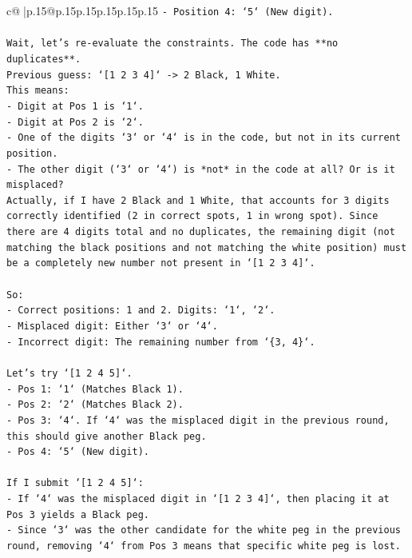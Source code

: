 \documentclass{article}
\begin{document}
{\begin{supertabular}{c@{$\;$}|p{.15\linewidth}@{}p{.15\linewidth}p{.15\linewidth}p{.15\linewidth}p{.15\linewidth}p{.15\linewidth}}
{{{\texttt{{-} Position 4: `5` (New digit).} \\
\\ 
\texttt{Wait, let's re{-}evaluate the constraints. The code has **no duplicates**.} \\
\texttt{Previous guess: `{[}1 2 3 4{]}` {-}> 2 Black, 1 White.} \\
\texttt{This means:} \\
\texttt{{-} Digit at Pos 1 is `1`.} \\
\texttt{{-} Digit at Pos 2 is `2`.} \\
\texttt{{-} One of the digits `3` or `4` is in the code, but not in its current position.} \\
\texttt{{-} The other digit (`3` or `4`) is *not* in the code at all? Or is it misplaced?} \\
\texttt{Actually, if I have 2 Black and 1 White, that accounts for 3 digits correctly identified (2 in correct spots, 1 in wrong spot). Since there are 4 digits total and no duplicates, the remaining digit (not matching the black positions and not matching the white position) must be a completely new number not present in `{[}1 2 3 4{]}`.} \\
\\ 
\texttt{So:} \\
\texttt{{-} Correct positions: 1 and 2. Digits: `1`, `2`.} \\
\texttt{{-} Misplaced digit: Either `3` or `4`.} \\
\texttt{{-} Incorrect digit: The remaining number from `\{3, 4\}`.} \\
\\ 
\texttt{Let's try `{[}1 2 4 5{]}`.} \\
\texttt{{-} Pos 1: `1` (Matches Black 1).} \\
\texttt{{-} Pos 2: `2` (Matches Black 2).} \\
\texttt{{-} Pos 3: `4`. If `4` was the misplaced digit in the previous round, this should give another Black peg.} \\
\texttt{{-} Pos 4: `5` (New digit).} \\
\\ 
\texttt{If I submit `{[}1 2 4 5{]}`:} \\
\texttt{{-} If `4` was the misplaced digit in `{[}1 2 3 4{]}`, then placing it at Pos 3 yields a Black peg.} \\
\texttt{{-} Since `3` was the other candidate for the white peg in the previous round, removing `4` from Pos 3 means that specific white peg is lost.} \\
}}}
\end{supertabular}}
\end{document}
